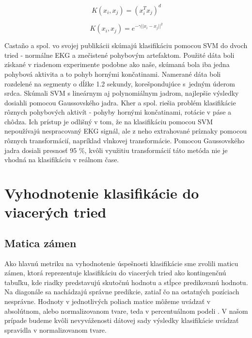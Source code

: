 \vspace{5pt}
\noindent
\begin{minipage}[t]{.45\textwidth}
    \begin{equation} 
        \label{eq:6}
        K(x_i,x_j) = (x_i^{T} x_j)^{d}
    \end{equation}
\end{minipage}
\hfill
\begin{minipage}[t]{.45\textwidth}
    \begin{equation} 
        \label{eq:7}
        K(x_i,x_j) = {e^{-\gamma ||x_i - x_j||^{2}}}
    \end{equation}
\end{minipage}
\vspace{5pt}

Castaño a spol. \cite{Castao2017} vo svojej publikácii skúmajú klasifikáciu pomocou SVM do dvoch tried - normálne EKG a znečistené pohybovým artefaktom. Použité dáta boli získané v riadenom experimente podobne ako naše, skúmaná bola iba jedna pohybová aktivita a to pohyb hornými končatinami. Namerané dáta boli rozdelené na segmenty o dĺžke 1.2 sekundy, korešpondujúce s~jedným úderom srdca. Skúmali SVM s lineárnym aj polynomiálnym jadrom, najlepšie výsledky dosiahli pomocou Gaussovského jadra. Kher a spol. \cite{Kher2015} riešia problém klasifikácie rôznych pohybových aktivít - pohyby hornými končatinami, rotácie v páse a chôdza. Ich prístup je odlišný v tom, že na klasifikáciu pomocou SVM nepoužívajú nespracovaný EKG signál, ale z neho extrahované príznaky pomocou rôznych transformácií, napríklad vlnkovej transformácie. Pomocou Gaussovského jadra dosiali presnosť 95 \%, kvôli využitiu transformácií táto metóda nie je vhodná na klasifikáciu v reálnom čase.


\section{Vyhodnotenie klasifikácie do viacerých tried}

\subsection{Matica zámen}

Ako hlavnú metriku na vyhodnotenie úspešnosti klasifikácie sme zvolili maticu zámen, ktorá reprezentuje klasifikáciu do viacerých tried ako kontingenčnú tabuľku, kde riadky predstavujú skutočnú hodnotu a stĺpce predikovanú hodnotu. Na diagonále sa nachádzajú správne predikcie, zatiaľ čo na ostatných pozíciach nesprávne. Hodnoty v jednotlivých poliach matice môžeme uvádzať v absolútnom, alebo normalizovanom tvare, teda v percentuálnom podeli \cite{grandini2020metrics}. V našom prípade budeme kvôli nevyváženosti dátovej sady výsledky klasifikácie uvádzať spravidla v normalizovanom tvare.

